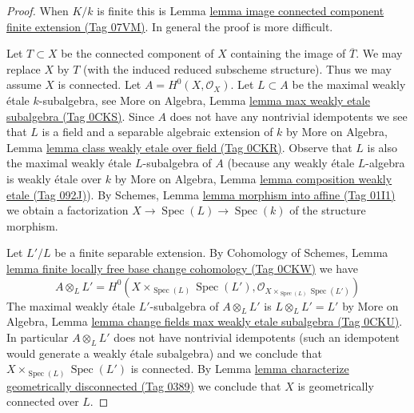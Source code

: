 \documentclass{amsart}
\theoremstyle{plain}
\theoremstyle{definition}
\theoremstyle{remark}
\numberwithin{equation}{subsection}
\def\Spec{\mathop{\mathrm{Spec}}}
\begin{document}
\begin{proof}
When $K/k$ is finite this is
Lemma \href{https://stacks.math.columbia.edu/tag/07VM}{lemma image connected component finite extension (Tag 07VM)}.
In general the proof is more difficult.

\medskip\noindent
Let $T \subset X$ be the connected component of $X$ containing
the image of $\overline{T}$. We may replace $X$ by $T$
(with the induced reduced subscheme structure). Thus we
may assume $X$ is connected. Let $A = H^0(X, \mathcal{O}_X)$.
Let $L \subset A$ be the maximal weakly \'etale $k$-subalgebra, see
More on Algebra, Lemma \href{https://stacks.math.columbia.edu/tag/0CKS}{lemma max weakly etale subalgebra (Tag 0CKS)}.
Since $A$ does not have any nontrivial idempotents we see
that $L$ is a field and a separable algebraic extension of $k$ by
More on Algebra, Lemma \href{https://stacks.math.columbia.edu/tag/0CKR}{lemma class weakly etale over field (Tag 0CKR)}.
Observe that $L$ is also the maximal weakly \'etale $L$-subalgebra of $A$
(because any weakly \'etale $L$-algebra is weakly \'etale over $k$
by More on Algebra, Lemma \href{https://stacks.math.columbia.edu/tag/092J}{lemma composition weakly etale (Tag 092J)}).
By Schemes, Lemma \href{https://stacks.math.columbia.edu/tag/01I1}{lemma morphism into affine (Tag 01I1)}
we obtain a factorization $X \to \Spec(L) \to \Spec(k)$
of the structure morphism.

\medskip\noindent
Let $L'/L$ be a finite separable extension. By
Cohomology of Schemes, Lemma
\href{https://stacks.math.columbia.edu/tag/0CKW}{lemma finite locally free base change cohomology (Tag 0CKW)}
we have
$$
A \otimes_L L' =
H^0(X \times_{\Spec(L)} \Spec(L'), \mathcal{O}_{X \times_{\Spec(L)} \Spec(L')})
$$
The maximal weakly \'etale $L'$-subalgebra of $A \otimes_L L'$
is $L \otimes_L L' = L'$ by More on Algebra, Lemma
\href{https://stacks.math.columbia.edu/tag/0CKU}{lemma change fields max weakly etale subalgebra (Tag 0CKU)}.
In particular $A \otimes_L L'$ does not have nontrivial idempotents
(such an idempotent would generate a weakly \'etale subalgebra)
and we conclude that $X \times_{\Spec(L)} \Spec(L')$ is connected.
By Lemma \href{https://stacks.math.columbia.edu/tag/0389}{lemma characterize geometrically disconnected (Tag 0389)}
we conclude that $X$ is geometrically connected over $L$.


\end{proof}
\end{document}
